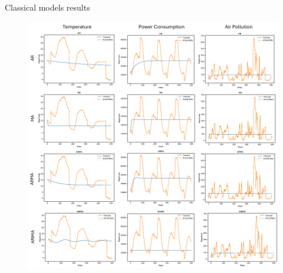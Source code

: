 \documentclass[aspectratio=16 9,10pt]{beamer}
\begin{document}
\begin{frame}{Classical models results}
\begin{figure}[]
	\begin{center}
       \includegraphics[width=1\textwidth, height=0.8\textheight, keepaspectratio]{classical.pdf} 
	\end{center}
	\label{fig:classical_perf}
\end{figure}
\end{frame}
\end{document}
